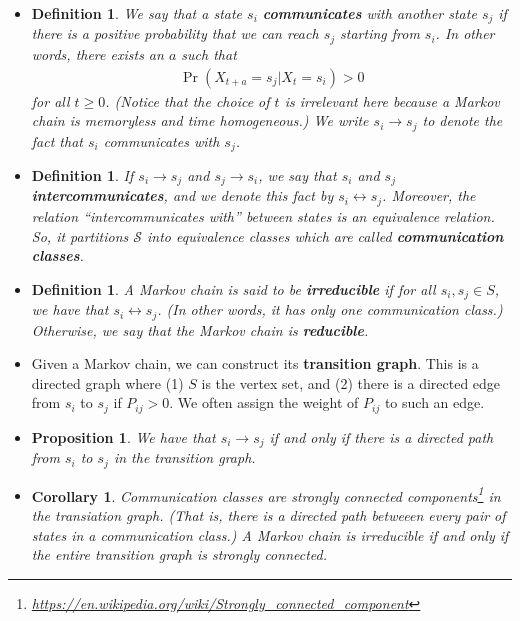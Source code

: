 \documentclass[10pt]{article}
\newtheorem{definition}[lemma]{Definition}
\newtheorem{proposition}[lemma]{Proposition}
\newtheorem{corollary}[lemma]{Corollary}
\begin{document}
\begin{itemize}
  \item \begin{definition}
    We say that a state $s_i$ {\bf communicates} with another state $s_j$ if there is a positive probability that we can reach $s_j$ starting from $s_i$. In other words, there exists an $a$ such that
    \begin{align*}
        \Pr(X_{t+a} = s_j|X_t=s_i) > 0
    \end{align*}
    for all $t \geq 0$. (Notice that the choice of $t$ is irrelevant here because a Markov chain is memoryless and time homogeneous.) We write $s_i \rightarrow s_j$ to denote the fact that $s_i$ communicates with $s_j$.
  \end{definition}

  \item \begin{definition}
    If $s_i \rightarrow s_j$ and $s_j \rightarrow s_i$, we say that $s_i$ and $s_j$ {\bf intercommunicates}, and we denote this fact by $s_i \leftrightarrow s_j$. Moreover, the relation ``intercommunicates with'' between states is an equivalence relation. So, it partitions $\mathcal{S}$ into equivalence classes which are called {\bf communication classes}.
  \end{definition}

  \item \begin{definition}
    A Markov chain is said to be {\bf irreducible} if for all $s_i, s_j \in S$, we have that $s_i \leftrightarrow s_j$. (In other words, it has only one communication class.) Otherwise, we say that the Markov chain is {\bf reducible}.
  \end{definition}

  \item Given a Markov chain, we can construct its {\bf transition graph}. This is a directed graph where (1) $S$ is the vertex set, and (2) there is a directed edge from $s_i$ to $s_j$ if $P_{ij} > 0$. We often assign the weight of $P_{ij}$ to such an edge.
  
  \item \begin{proposition}
    We have that $s_i \rightarrow s_j$ if and only if there is a directed path from $s_i$ to $s_j$ in the transition graph.
  \end{proposition}

  \item \begin{corollary}
    Communication classes are strongly connected components\footnote{\url{https://en.wikipedia.org/wiki/Strongly_connected_component}} in the transiation graph. (That is, there is a directed path betweeen every pair of states in a communication class.) A Markov chain is irreducible if and only if the entire transition graph is strongly connected.
  \end{corollary}
\end{itemize}
\end{document}
